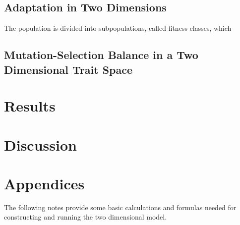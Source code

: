 \documentclass{article}
\begin{document}
\subsection*{Adaptation in Two Dimensions}
%
The population is divided into subpopulations, called fitness classes, which 

\subsection*{Mutation-Selection Balance in a Two Dimensional Trait Space}


\section*{Results}

\section*{Discussion}

\section*{Appendices}
The following notes provide some basic calculations and formulas needed for constructing and running the two dimensional model.




\end{document}
